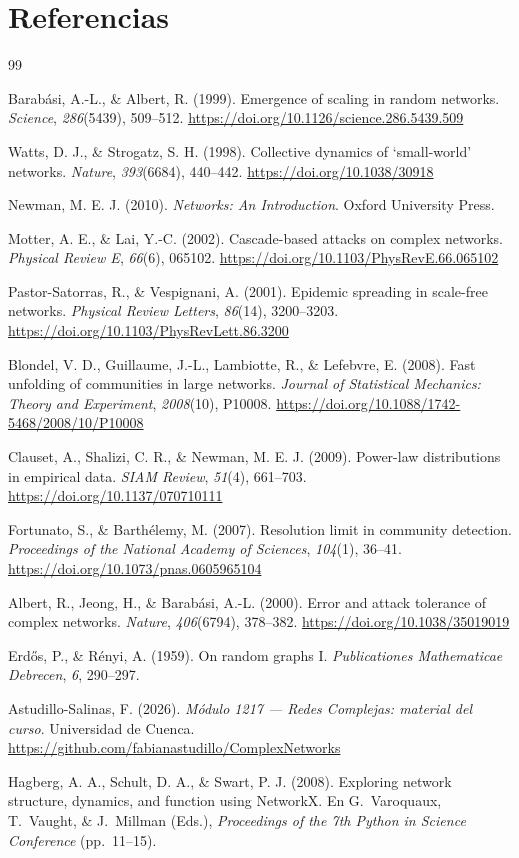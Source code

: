 \documentclass[11pt, a4paper]{article}
\begin{document}
\section*{Referencias}
\label{sec:refs}
\begin{thebibliography}{99}

Barabási, A.-L., \& Albert, R. (1999).
Emergence of scaling in random networks.
\textit{Science}, \textit{286}(5439), 509--512.
\url{https://doi.org/10.1126/science.286.5439.509}

Watts, D. J., \& Strogatz, S. H. (1998).
Collective dynamics of `small-world' networks.
\textit{Nature}, \textit{393}(6684), 440--442.
\url{https://doi.org/10.1038/30918}

Newman, M. E. J. (2010).
\textit{Networks: An Introduction}.
Oxford University Press.

Motter, A. E., \& Lai, Y.-C. (2002).
Cascade-based attacks on complex networks.
\textit{Physical Review E}, \textit{66}(6), 065102.
\url{https://doi.org/10.1103/PhysRevE.66.065102}

Pastor-Satorras, R., \& Vespignani, A. (2001).
Epidemic spreading in scale-free networks.
\textit{Physical Review Letters}, \textit{86}(14), 3200--3203.
\url{https://doi.org/10.1103/PhysRevLett.86.3200}

Blondel, V. D., Guillaume, J.-L., Lambiotte, R., \& Lefebvre, E. (2008).
Fast unfolding of communities in large networks.
\textit{Journal of Statistical Mechanics: Theory and Experiment},
\textit{2008}(10), P10008.
\url{https://doi.org/10.1088/1742-5468/2008/10/P10008}

Clauset, A., Shalizi, C. R., \& Newman, M. E. J. (2009).
Power-law distributions in empirical data.
\textit{SIAM Review}, \textit{51}(4), 661--703.
\url{https://doi.org/10.1137/070710111}

Fortunato, S., \& Barthélemy, M. (2007).
Resolution limit in community detection.
\textit{Proceedings of the National Academy of Sciences},
\textit{104}(1), 36--41.
\url{https://doi.org/10.1073/pnas.0605965104}

Albert, R., Jeong, H., \& Barabási, A.-L. (2000).
Error and attack tolerance of complex networks.
\textit{Nature}, \textit{406}(6794), 378--382.
\url{https://doi.org/10.1038/35019019}

Erdős, P., \& Rényi, A. (1959).
On random graphs I.
\textit{Publicationes Mathematicae Debrecen}, \textit{6}, 290--297.

Astudillo-Salinas, F. (2026).
\textit{Módulo 1217 --- Redes Complejas: material del curso}.
Universidad de Cuenca.
\url{https://github.com/fabianastudillo/ComplexNetworks}

Hagberg, A. A., Schult, D. A., \& Swart, P. J. (2008).
Exploring network structure, dynamics, and function using NetworkX.
En G.~Varoquaux, T.~Vaught, \& J.~Millman (Eds.),
\textit{Proceedings of the 7th Python in Science Conference} (pp.~11--15).

\end{thebibliography}
\end{document}

